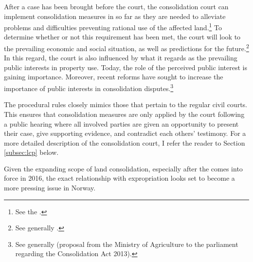 After a case has been brought before the court, the consolidation court can implement consolidation measures in so far as they are needed to alleviate problems and difficulties preventing rational use of the affected land.\footnote{See the \cite[1]{lca79}.} To determine whether or not this requirement has been met, the court will look to the prevailing economic and social situation, as well as predictions for the future.\footnote{See generally \cite{reiten09}.} In this regard, the court is also influenced by what it regards as the prevailing public interests in property use. Today, the role of the perceived public interest is gaining importance. Moreover,  recent reforms have sought to increase the importance of public interests in consolidation disputes.\footnote{See generally \cite{prop12} (proposal from the Ministry of Agriculture to the parliament regarding the Consolidation Act 2013).}


The procedural rules closely mimics those that pertain to the regular civil courts. This ensures that consolidation measures are only applied by the court following a public hearing where all involved parties are given an opportunity to present their case, give supporting evidence, and contradict each others' testimony. For a more detailed description of the consolidation court, I refer the reader to Section \ref{subsec:lcp} below.

Given the expanding scope of land consolidation, especially after the \cite{lca13} comes into force in 2016, the exact relationship with expropriation looks set to become a more pressing issue in Norway.

